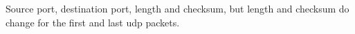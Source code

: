 Source port, destination port, length and checksum, but length and checksum do change for the first and last udp packets.